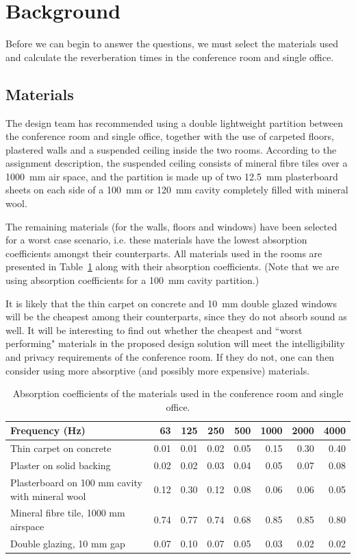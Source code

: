 \section{Background}

Before we can begin to answer the questions, we must select the materials used and calculate the reverberation times in the conference room and single office.


\subsection{Materials}

The design team has recommended using a double lightweight partition between the conference room and single office, together with the use of carpeted floors, plastered walls and a suspended ceiling inside the two rooms.
According to the assignment description, the suspended ceiling consists of mineral fibre tiles over a 1000~mm air space, and the partition is made up of two 12.5~mm plasterboard sheets on each side of a 100~mm or 120~mm cavity completely filled with mineral wool.

The remaining materials (for the walls, floors and windows) have been selected for a worst case scenario, i.e. these materials have the lowest absorption coefficients amongst their counterparts.
All materials used in the rooms are presented in Table~\ref{tbl:absorption} along with their absorption coefficients.
(Note that we are using absorption coefficients for a 100~mm cavity partition.)

It is likely that the thin carpet on concrete and 10~mm double glazed windows will be the cheapest among their counterparts, since they do not absorb sound as well.
It will be interesting to find out whether the cheapest and ``worst performing" materials in the proposed design solution will meet the intelligibility and privacy requirements of the conference room.
If they do not, one can then consider using more absorptive (and possibly more expensive) materials.


\begin{table}[htbp]
	\caption{Absorption coefficients of the materials used in the conference room and single office.}
	\label{tbl:absorption}
	\centering
	\begin{tabular}{@{}lrrrrrrr@{}}
		\toprule
		Frequency (Hz) & 63 & 125 & 250 & 500 & 1000 & 2000 & 4000 \\ \midrule
		Thin carpet on concrete & 0.01 & 0.01 & 0.02 & 0.05 & 0.15 & 0.30 & 0.40 \\
		Plaster on solid backing & 0.02 & 0.02 & 0.03 & 0.04 & 0.05 & 0.07 & 0.08 \\
		Plasterboard on 100 mm cavity with mineral wool & 0.12 & 0.30 & 0.12 & 0.08 & 0.06 & 0.06 & 0.05 \\
		Mineral fibre tile, 1000 mm airspace & 0.74 & 0.77 & 0.74 & 0.68 & 0.85 & 0.85 & 0.80 \\
		Double glazing, 10 mm gap & 0.07 & 0.10 & 0.07 & 0.05 & 0.03 & 0.02 & 0.02 \\ \bottomrule
	\end{tabular}
\end{table}


